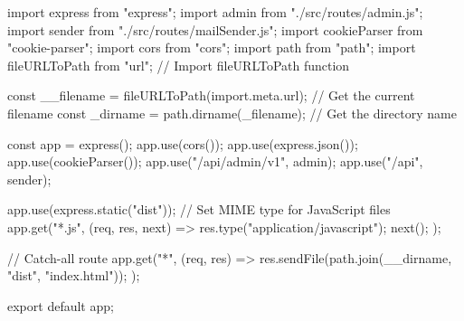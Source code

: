 import express from "express";
import admin from "./src/routes/admin.js";
import sender from "./src/routes/mailSender.js";
import cookieParser from "cookie-parser";
import cors from "cors";
import path from "path";
import { fileURLToPath } from "url"; // Import fileURLToPath function


const __filename = fileURLToPath(import.meta.url); // Get the current filename
const _dirname = path.dirname(_filename); // Get the directory name

const app = express();
app.use(cors());
app.use(express.json());
app.use(cookieParser());
app.use("/api/admin/v1", admin);
app.use("/api", sender);

app.use(express.static("dist"));
// Set MIME type for JavaScript files
app.get("*.js", (req, res, next) => {
  res.type("application/javascript");
  next();
});

// Catch-all route
app.get("*", (req, res) => {
  res.sendFile(path.join(__dirname, "dist", "index.html"));
});

export default app;